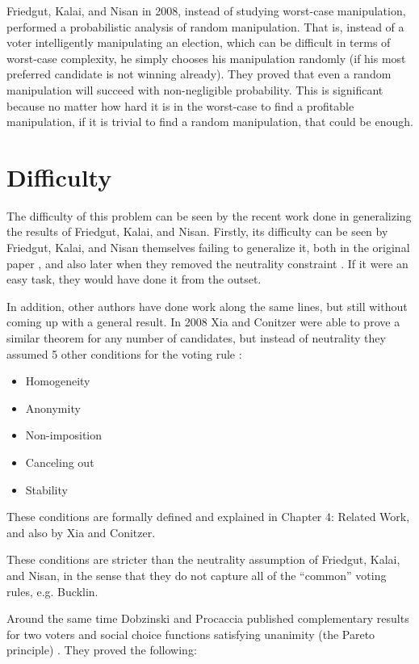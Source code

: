 	Friedgut, Kalai, and Nisan \cite{friedgut2008elections} in 2008, instead of studying worst-case manipulation, performed a probabilistic analysis of random manipulation. That is, instead of a voter intelligently manipulating an election, which can be difficult in terms of worst-case complexity, he simply chooses his manipulation randomly (if his most preferred candidate is not winning already). They proved that even a random manipulation will succeed with non-negligible probability. This is significant because no matter how hard it is in the worst-case to find a profitable manipulation, if it is trivial to find a random manipulation, that could be enough.


\section{Difficulty}

	The difficulty of this problem can be seen by the recent work done in generalizing the results of Friedgut, Kalai, and Nisan. Firstly, its difficulty can be seen by Friedgut, Kalai, and Nisan themselves failing to generalize it, both in the original paper \cite{friedgut2008elections}, and also later when they removed the neutrality constraint \cite{friedgut2011quantitative}. If it were an easy task, they would have done it from the outset.

	In addition, other authors have done work along the same lines, but still without coming up with a general result. In 2008 Xia and Conitzer were able to prove a similar theorem for any number of candidates, but instead of neutrality they assumed 5 other conditions for the voting rule \cite{xia2008sufficient}:

	\begin{itemize}
		\item Homogeneity
		\item Anonymity
		\item Non-imposition
		\item Canceling out
		\item Stability
	\end{itemize}

	These conditions are formally defined and explained in Chapter 4: Related Work, and also by Xia and Conitzer.

	These conditions are stricter than the neutrality assumption of Friedgut, Kalai, and Nisan, in the sense that they do not capture all of the ``common'' voting rules, e.g. Bucklin.

	Around the same time Dobzinski and Procaccia published complementary results for two voters and social choice functions satisfying unanimity (the Pareto principle) \cite{dobzinski2008frequent}. They proved the following:

